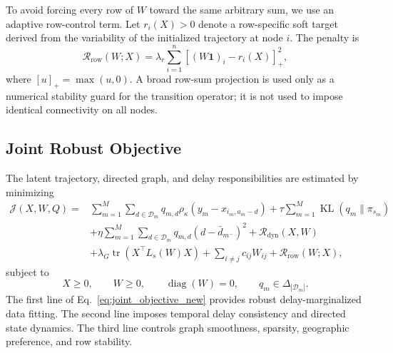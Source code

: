 To avoid forcing every row of $W$ toward the same arbitrary sum, we use an adaptive row-control term. Let $r_i(X)>0$ denote a row-specific soft target derived from the variability of the initialized trajectory at node $i$. The penalty is
\begin{equation}
    \mathcal{R}_{\mathrm{row}}(W;X)
    =\lambda_r\sum_{i=1}^{n}
    \left[(W\mathbf{1})_i-r_i(X)\right]_{+}^{2},
    \label{eq:adaptive_row_penalty_new}
\end{equation}
where $[u]_+=\max(u,0)$. A broad row-sum projection is used only as a numerical stability guard for the transition operator; it is not used to impose identical connectivity on all nodes.

\subsection{Joint Robust Objective}
\label{subsec:joint_objective}
The latent trajectory, directed graph, and delay responsibilities are estimated by minimizing
\begin{align}
    \mathcal{J}(X,W,Q)
    ={}&
    \sum_{m=1}^{M}\sum_{d\in\mathcal{D}_m}
    q_{m,d}\rho_{\kappa}\!\left(y_m-x_{i_m,a_m-d}\right)
    +\tau\sum_{m=1}^{M}\operatorname{KL}(q_m\|\pi_{s_m})
    \nonumber\\
    &+\eta\sum_{m=1}^{M}\sum_{d\in\mathcal{D}_m}
    q_{m,d}\left(d-\bar d_{m^-}\right)^2
    +\mathcal{R}_{\mathrm{dyn}}(X,W)
    \nonumber\\
    &+\lambda_G\operatorname{tr}\!\left(X^{\top}L_s(W)X\right)
    +\sum_{i\neq j}c_{ij}W_{ij}
    +\mathcal{R}_{\mathrm{row}}(W;X),
    \label{eq:joint_objective_new}
\end{align}
subject to
\begin{equation}
    X\geq0,\qquad W\geq0,\qquad \operatorname{diag}(W)=0,
    \qquad q_m\in\Delta_{|\mathcal{D}_m|}.
    \label{eq:constraints_new}
\end{equation}
The first line of Eq.~\eqref{eq:joint_objective_new} provides robust delay-marginalized data fitting. The second line imposes temporal delay consistency and directed state dynamics. The third line controls graph smoothness, sparsity, geographic preference, and row stability.

